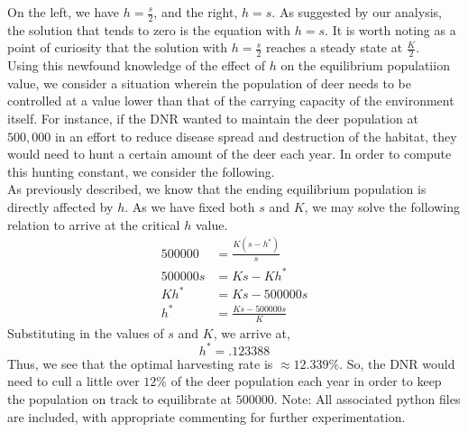 \documentclass[letterpaper,10pt]{article}
\begin{document}
On the left, we have $h=\frac{s}{2}$, and the right, $h=s$. As suggested by our analysis, the solution that tends to zero is the equation with $h=s$. It is worth noting as a point of curiosity that the solution with $h=\frac{s}{2}$ reaches a steady state at $\frac{K}{2}$.\\
Using this newfound knowledge of the effect of $h$ on the equilibrium populatiion value, we consider a situation wherein the population of deer needs to be controlled at a value lower than that of the carrying capacity of the environment itself. For instance, if the DNR wanted to maintain the deer population at $500,000$ in an effort to reduce disease spread and destruction of the habitat, they would need to hunt a certain amount of the deer each year. In order to compute this hunting constant, we consider the following.\\
As previously described, we know that the ending equilibrium population is directly affected by $h$. As we have fixed both $s$ and $K$, we may solve the following relation to arrive at the critical $h$ value.
\begin{align*}
500000 &= \frac{K(s-h^*)}{s}\\
500000s &= Ks-Kh^*\\
Kh^* &= Ks-500000s\\
h^* &= \frac{Ks-500000s}{K}
\end{align*}
Substituting in the values of $s$ and $K$, we arrive at,
\[h^*=.123388\]
Thus, we see that the optimal harvesting rate is $\approx12.339\%$. So, the DNR would need to cull a little over $12\%$ of the deer population each year in order to keep the population on track to equilibrate at $500000$.
\newpage
Note: All associated python files are included, with appropriate commenting for further experimentation.
\end{document}
